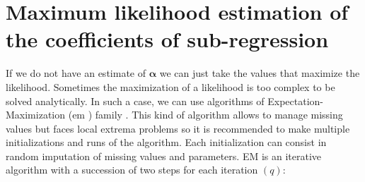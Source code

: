 \documentclass[12pt,a4paper]{report}
\begin{document}
	\section{Maximum likelihood estimation of the coefficients of sub-regression}
			If we do not have an estimate of $\boldsymbol{\alpha}$ we can just take the values that maximize the likelihood. Sometimes the maximization of a likelihood is too complex to be solved analytically. In such a case, we can use algorithms of Expectation-Maximization ({\sc em} \cite{mclachlan2007algorithm}) family \cite{mclachlan2007algorithm}. This kind of algorithm allows to manage missing values \cite{dempster1977maximum}  %
%			
	but faces local extrema problems so it is recommended to make multiple initializations and runs of the algorithm. Each initialization can consist in random imputation of missing values and parameters.
EM is an iterative algorithm with a succession of two steps	for each iteration $(q)$:
\end{document}
